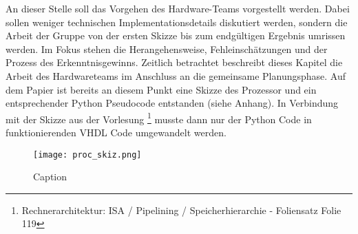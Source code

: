 \documentclass[paper=a4,fontsize=12pt,twocolumn]{scrreprt}
\begin{document}
An dieser Stelle soll das Vorgehen des Hardware-Teams vorgestellt werden.
Dabei sollen weniger technischen Implementationsdetails diskutiert werden, sondern die Arbeit der Gruppe von der ersten Skizze bis zum endgültigen Ergebnis umrissen werden.
Im Fokus stehen die Herangehensweise, Fehleinschätzungen und der Prozess des Erkenntnisgewinns.
Zeitlich betrachtet beschreibt dieses Kapitel die Arbeit des Hardwareteams im Anschluss an die gemeinsame Planungsphase.
Auf dem Papier ist bereits an diesem Punkt eine Skizze des Prozessor und ein entsprechender Python Pseudocode entstanden (siehe Anhang).
In Verbindung mit der Skizze aus der Vorlesung \footnote{Rechnerarchitektur: ISA / Pipelining / Speicherhierarchie - Foliensatz Folie 119} musste dann nur der Python Code in funktionierenden VHDL Code umgewandelt werden.

\begin{figure}
    \centering
    \texttt{[image: proc\_skiz.png]}
    \caption{Caption}
    \label{fig:my_label}
\end{figure}
\end{document}
